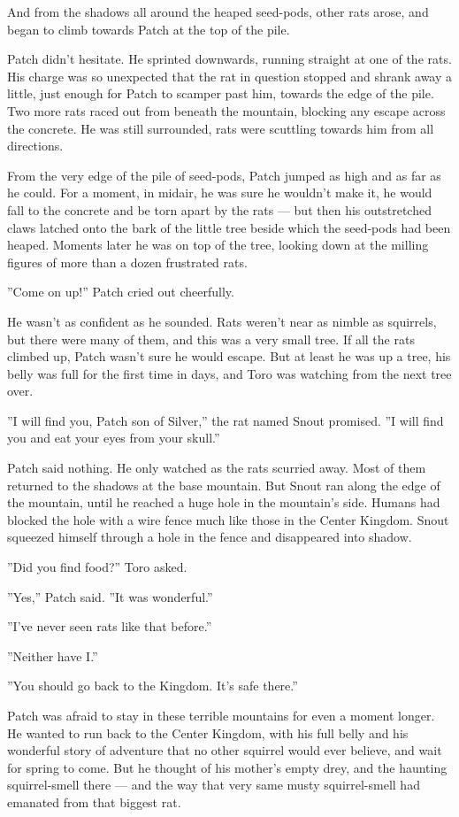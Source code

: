 \documentclass[12pt]{book}
\begin{document}
And from the shadows all around the heaped seed-pods, other rats arose, and began to climb towards Patch at the top of the pile.

Patch didn't hesitate. He sprinted downwards, running straight at one of the rats. His charge was so unexpected that the rat in question stopped and shrank away a little, just enough for Patch to scamper past him, towards the edge of the pile. Two more rats raced out from beneath the mountain, blocking any escape across the concrete. He was still surrounded, rats were scuttling towards him from all directions.

From the very edge of the pile of seed-pods, Patch jumped as high and as far as he could. For a moment, in midair, he was sure he wouldn't make it, he would fall to the concrete and be torn apart by the rats ---
but then his outstretched claws latched onto the bark of the little tree beside which the seed-pods had been heaped. Moments later he was on top of the tree, looking down at the milling figures of more than a dozen frustrated rats.

''Come on up!'' Patch cried out cheerfully.

He wasn't as confident as he sounded. Rats weren't near as nimble as squirrels, but there were many of them, and this was a very small tree. If all the rats climbed up, Patch wasn't sure he would escape. But at least he was up a tree, his belly was full for the first time in days, and Toro was watching from the next tree over.

''I will find you, Patch son of Silver,'' the rat named Snout promised. ''I will find you and eat your eyes from your skull.''

Patch said nothing. He only watched as the rats scurried away. Most of them returned to the shadows at the base mountain. But Snout ran along the edge of the mountain, until he reached a huge hole in the mountain's side. Humans had blocked the hole with a wire fence much like those in the Center Kingdom. Snout squeezed himself through a hole in the fence and disappeared into shadow.

''Did you find food?'' Toro asked.

''Yes,'' Patch said. ''It was wonderful.''

''I've never seen rats like that before.''

''Neither have I.''

''You should go back to the Kingdom. It's safe there.''

Patch was afraid to stay in these terrible mountains for even a moment longer. He wanted to run back to the Center Kingdom, with his full belly and his wonderful story of adventure that no other squirrel would ever believe, and wait for spring to come. But he thought of his mother's empty drey, and the haunting squirrel-smell there ---
and the way that very same musty squirrel-smell had emanated from that biggest rat.
\end{document}
